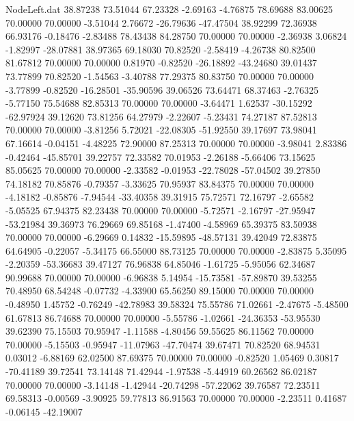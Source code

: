 \begin{filecontents}{NodeLeft.dat}
  38.87238   73.51044   67.23328    -2.69163   -4.76875   78.69688   83.00625   70.00000   70.00000   -3.51044    2.76672  -26.79636  -47.47504
  38.92299   72.36938   66.93176    -0.18476   -2.83488   78.43438   84.28750   70.00000   70.00000   -2.36938    3.06824   -1.82997  -28.07881
  38.97365   69.18030   70.82520    -2.58419   -4.26738   80.82500   81.67812   70.00000   70.00000    0.81970   -0.82520  -26.18892  -43.24680
  39.01437   73.77899   70.82520    -1.54563   -3.40788   77.29375   80.83750   70.00000   70.00000   -3.77899   -0.82520  -16.28501  -35.90596
  39.06526   73.64471   68.37463    -2.76325   -5.77150   75.54688   82.85313   70.00000   70.00000   -3.64471    1.62537  -30.15292  -62.97924
  39.12620   73.81256   64.27979    -2.22607   -5.23431   74.27187   87.52813   70.00000   70.00000   -3.81256    5.72021  -22.08305  -51.92550
  39.17697   73.98041   67.16614    -0.04151   -4.48225   72.90000   87.25313   70.00000   70.00000   -3.98041    2.83386   -0.42464  -45.85701
  39.22757   72.33582   70.01953    -2.26188   -5.66406   73.15625   85.05625   70.00000   70.00000   -2.33582   -0.01953  -22.78028  -57.04502
  39.27850   74.18182   70.85876    -0.79357   -3.33625   70.95937   83.84375   70.00000   70.00000   -4.18182   -0.85876   -7.94544  -33.40358
  39.31915   75.72571   72.16797    -2.65582   -5.05525   67.94375   82.23438   70.00000   70.00000   -5.72571   -2.16797  -27.95947  -53.21984
  39.36973   76.29669   69.85168    -1.47400   -4.58969   65.39375   83.50938   70.00000   70.00000   -6.29669    0.14832  -15.59895  -48.57131
  39.42049   72.83875   64.64905    -0.22057   -5.34175   66.55000   88.73125   70.00000   70.00000   -2.83875    5.35095   -2.20359  -53.36683
  39.47127   76.96838   64.85046    -1.61725   -5.95056   62.34687   90.99688   70.00000   70.00000   -6.96838    5.14954  -15.73581  -57.89870
  39.53255   70.48950   68.54248    -0.07732   -4.33900   65.56250   89.15000   70.00000   70.00000   -0.48950    1.45752   -0.76249  -42.78983
  39.58324   75.55786   71.02661    -2.47675   -5.48500   61.67813   86.74688   70.00000   70.00000   -5.55786   -1.02661  -24.36353  -53.95530
  39.62390   75.15503   70.95947    -1.11588   -4.80456   59.55625   86.11562   70.00000   70.00000   -5.15503   -0.95947  -11.07963  -47.70474
  39.67471   70.82520   68.94531     0.03012   -6.88169   62.02500   87.69375   70.00000   70.00000   -0.82520    1.05469    0.30817  -70.41189
  39.72541   73.14148   71.42944    -1.97538   -5.44919   60.26562   86.02187   70.00000   70.00000   -3.14148   -1.42944  -20.74298  -57.22062
  39.76587   72.23511   69.58313    -0.00569   -3.90925   59.77813   86.91563   70.00000   70.00000   -2.23511    0.41687   -0.06145  -42.19007

\end{filecontents}
